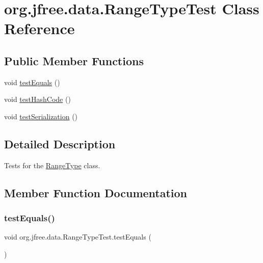 \hypertarget{classorg_1_1jfree_1_1data_1_1_range_type_test}{}\section{org.\+jfree.\+data.\+Range\+Type\+Test Class Reference}
\label{classorg_1_1jfree_1_1data_1_1_range_type_test}
\subsection*{Public Member Functions}
\begin{DoxyCompactItemize}
\item 
void \mbox{\hyperlink{classorg_1_1jfree_1_1data_1_1_range_type_test_aebfb214fcb4365ed1bb1a7ad716a4b52}{test\+Equals}} ()
\item 
void \mbox{\hyperlink{classorg_1_1jfree_1_1data_1_1_range_type_test_accdcc123a6d3bccb944566dc4acd675c}{test\+Hash\+Code}} ()
\item 
void \mbox{\hyperlink{classorg_1_1jfree_1_1data_1_1_range_type_test_aa2622e2003a63da460187ca6d7f2c7a0}{test\+Serialization}} ()
\end{DoxyCompactItemize}


\subsection{Detailed Description}
Tests for the \mbox{\hyperlink{classorg_1_1jfree_1_1data_1_1_range_type}{Range\+Type}} class. 

\subsection{Member Function Documentation}
\mbox{\label{classorg_1_1jfree_1_1data_1_1_range_type_test_aebfb214fcb4365ed1bb1a7ad716a4b52}} 
\subsubsection{\texorpdfstring{test\+Equals()}{testEquals()}}
{\footnotesize\ttfamily void org.\+jfree.\+data.\+Range\+Type\+Test.\+test\+Equals (\begin{DoxyParamCaption}{ }\end{DoxyParamCaption})}


